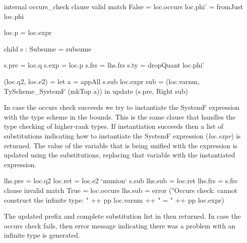 \begin{code}
   internal occurs_check
     clause valid
       match False = loc.occurs
       loc.phi' = fromJust loc.phi
       
       loc.p = loc.expr
       
       child s : Subsume = subsume
       
       s.pre = loc.q
       s.exp = loc.p
       s.frs = lhs.frs
       s.ty  = dropQuant loc.phi'
       
       (loc.q2, loc.e2) = let a   = appAll s.sub loc.expr
                              sub = (loc.varnm, TyScheme_SystemF (mkTop a))
                          in update (s.pre, Right sub)
\end{code}
In case the occurs check succeeds we try to instantiate the SystemF expression with the type scheme in the bounds. This is the same clause that handles the type checking of higher-rank types. If instantiation succeeds then a list of substitutions indicating how to instantiate the SystemF expression (\emph{loc.expr}) is returned.
The value of the variable that is being unified with the expression is updated using the substitutions, replacing that variable with the instantiated expression.

\begin{code}
     lhs.pre = loc.q2
     loc.ret = loc.e2 `munion` s.sub
     lhs.sub = loc.ret
     lhs.frs = s.frs  
   clause invalid
     match True = loc.occurs
     lhs.sub = error ("Occurs check: cannot construct the infinite type: " ++ pp loc.varnm ++ " = " ++ pp loc.expr)
\end{code}
The updated prefix and complete substitution list in then returned. In case the occurs check fails, then error message indicating there was a problem with an infinite type is generated.

